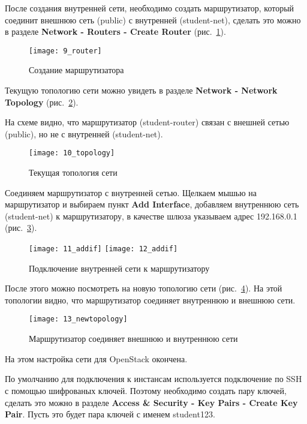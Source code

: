 \clearpage

После создания внутренней сети, необходимо создать маршрутизатор, который соединит внешнюю сеть (public) с внутренней (student-net), сделать это можно в разделе \textbf{Network - Routers - Create Router} (рис.~\ref{pic:router}).
\begin{figure}[ht]
    \centering
    \texttt{[image: 9\_router]}
    \caption{Создание маршрутизатора}\label{pic:router}
\end{figure}

Текущую топологию сети можно увидеть в разделе \textbf{Network - Network Topology} (рис.~\ref{pic:topology}).

На схеме видно, что маршрутизатор (student-router) связан с внешней сетью (public), но не с внутренней (student-net).
\begin{figure}[ht]
    \centering
    \texttt{[image: 10\_topology]}
    \caption{Текущая топология сети}\label{pic:topology}
\end{figure}

Соединяем маршрутизатор с внутренней сетью.
Щелкаем мышью на маршрутизатор и выбираем пункт \textbf{Add Interface}, добавляем внутреннюю сеть (student-net) к маршрутизатору, в качестве шлюза указываем адрес 192.168.0.1 (рис.~\ref{pic:addif}).
\begin{figure}[ht]
    \centering
    \texttt{[image: 11\_addif]}
    \texttt{[image: 12\_addif]}
    \caption{Подключение внутренней сети к маршрутизатору}\label{pic:addif}
\end{figure}

После этого можно посмотреть на новую топологию сети (рис.~\ref{pic:new_topology}).
На этой топологии видно, что маршрутизатор соединяет внутреннюю и внешнюю сети.
\begin{figure}[ht]
    \centering
    \texttt{[image: 13\_newtopology]}
    \caption{Маршрутизатор соединяет внешнюю и внутреннюю сети}\label{pic:new_topology}
\end{figure}

На этом настройка сети для OpenStack окончена.

\clearpage

По умолчанию для подключения к инстансам используется подключение по SSH с помощью шифрованых ключей.
Поэтому необходимо создать пару ключей, сделать это можно в разделе \textbf{Access \& Security - Key Pairs - Create Key Pair}.
Пусть это будет пара ключей с именем student123.

